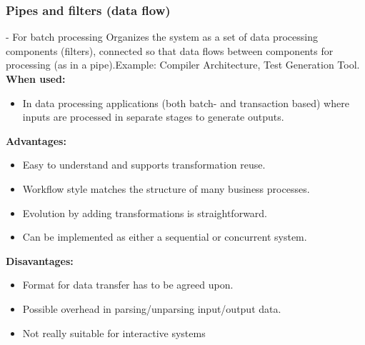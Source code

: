 \documentclass[../ESOF_notes.tex]{subfiles}
\begin{document}
\subsubsection{Pipes and filters (data flow)} - For batch processing\newline\newline
Organizes the system as a set of data processing components (filters), connected so that data flows between components for processing (as in a pipe).\newline Example: Compiler Architecture, Test Generation Tool.\newline\newline
\textbf{When used:}
\begin{itemize}
    \item In data processing applications (both batch- and transaction based) where inputs are processed in separate stages to generate outputs.
\end{itemize}
\textbf{Advantages:}
\begin{itemize}
    \item Easy to understand and supports transformation reuse.
    \item Workflow style matches the structure of many business processes.
    \item Evolution by adding transformations is straightforward.
    \item Can be implemented as either a sequential or concurrent system.
\end{itemize}
\textbf{Disavantages:}
\begin{itemize}
    \item Format for data transfer has to be agreed upon.
    \item Possible overhead in parsing/unparsing input/output data.
    \item Not really suitable for interactive systems
\end{itemize}
\end{document}
